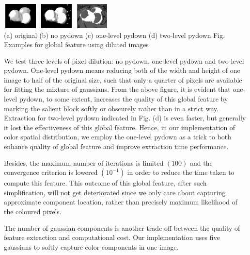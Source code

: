 \documentclass[10pt,twocolumn,letterpaper]{article}
\begin{document}
\begin{center}
    \includegraphics[width=0.72in,height=0.52in]{./Figures/pydownCompare/3NOPYDOWN.jpg}
    \includegraphics[width=0.72in,height=0.52in]{./Figures/pydownCompare/3PYDOWN.jpg} 
    \includegraphics[width=0.72in,height=0.52in]{./Figures/pydownCompare/3DOUBLEPYDOWN.jpg} \\
    \footnotesize (a) original (b) no pydown (c) one-level pydown (d) two-level pydown
    Fig. Examples for global feature using diluted images \\
    \end{center}

    We test three levels of pixel dilution: no pydown, one-level pydown and two-level pydown. One-level
    pydown means reducing both of the width and height of one image to half of the original size, 
    such that only a quarter of pixels are available for fitting the mixture of gaussians.
    From the above figure, it is evident that one-level pydown, to some extent, increases the quality of 
    this global feature by marking the salient block softly or obscurely rather than in a strict way. 
    Extraction for two-level pydown 
    indicated in Fig. (d) is even faster, but generally it lost the effectiveness of this global feature.
    Hence, in our implementation of color spatial distribution, we employ the one-level pydown as a trick
    to both enhance quality of global feature and improve extraction time performance.

    Besides, the maximum number of iterations is limited $(100)$ and the convergence criterion is lowered $(10^{-1})$
    in order to reduce the time taken to compute this feature.  This outcome of this global feature, after such
    simplification, will not get deteriorated since we only care about capturing 
    approximate component location, rather than precisely maximum likelihood of the coloured pixels.

    The number of gaussian components is another trade-off between the quality of feature extraction
    and computational cost. Our implementation uses five gaussians to softly capture color components in one image. 
\end{document}
